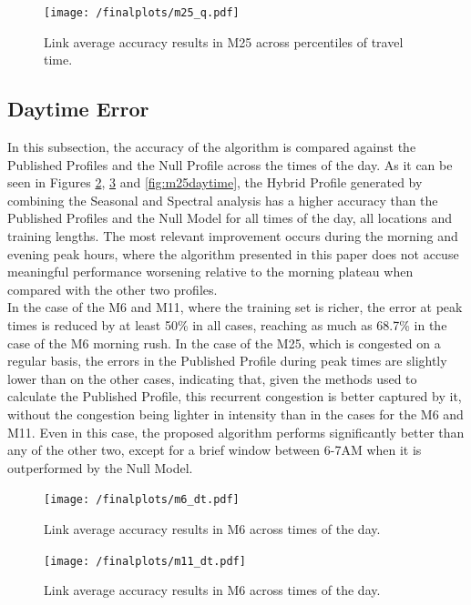 \documentclass[conference]{IEEEtran}
\begin{document}
\begin{figure}[htbp]
	\centering
	\texttt{[image: /finalplots/m25\_q.pdf]}
	\caption{Link average accuracy results in M25 across percentiles of travel time.}
	\label{fig:m25q}
\end{figure}

\subsection{Daytime Error}
In this subsection, the accuracy of the algorithm is compared against the Published Profiles and the Null Profile across the times of the day.
As it can be seen in Figures \ref{fig:m6daytime}, \ref{fig:m11daytime} and \ref{fig:m25daytime}, the Hybrid Profile generated by combining the Seasonal and Spectral analysis has a higher accuracy than the Published Profiles and the Null Model for all times of the day, all locations and training lengths. 
The most relevant improvement occurs during the morning and evening peak hours, where the algorithm presented in this paper does not accuse meaningful performance worsening relative to the morning plateau when compared with the other two profiles.\\
In the case of the M6 and M11, where the training set is richer, the error at peak times is reduced by at least 50\% in all cases, reaching as much as 68.7\% in the case of the M6 morning rush.
In the case of the M25, which is congested on a regular basis, the errors in the Published Profile during peak times are slightly lower than on the other cases, indicating that, given the methods used to calculate the Published Profile, this recurrent congestion is better captured by it, without the congestion being lighter in intensity than in the cases for the M6 and M11. 
Even in this case, the proposed algorithm performs significantly better than any of the other two, except for a brief window between 6-7AM when it is outperformed by the Null Model.
\begin{figure}[htbp]
	\centering
		\texttt{[image: /finalplots/m6\_dt.pdf]}
	\caption{Link average accuracy results in M6 across times of the day.}
	\label{fig:m6daytime}
\end{figure}

\begin{figure}[htbp]
	\centering
	\texttt{[image: /finalplots/m11\_dt.pdf]}
	\caption{Link average accuracy results in M6 across times of the day.}
	\label{fig:m11daytime}
\end{figure}
\end{document}
